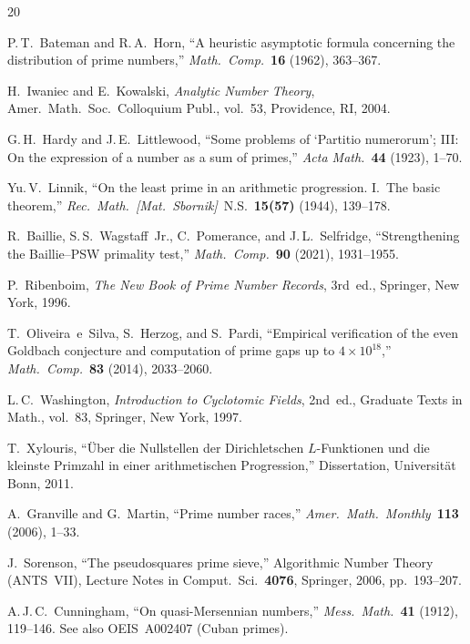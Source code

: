 \documentclass[11pt,a4paper]{article}
\begin{document}
\begin{thebibliography}{20}

P.\,T.~Bateman and R.\,A.~Horn,
``A heuristic asymptotic formula concerning the distribution of prime numbers,''
\textit{Math.\ Comp.}\ \textbf{16} (1962), 363--367.

H.~Iwaniec and E.~Kowalski,
\textit{Analytic Number Theory},
Amer.\ Math.\ Soc.\ Colloquium Publ., vol.~53, Providence, RI, 2004.

G.\,H.~Hardy and J.\,E.~Littlewood,
``Some problems of `Partitio numerorum'; III: On the expression of a number as a sum of primes,''
\textit{Acta Math.}\ \textbf{44} (1923), 1--70.

Yu.\,V.~Linnik,
``On the least prime in an arithmetic progression. I.\ The basic theorem,''
\textit{Rec.\ Math.\ [Mat.\ Sbornik]}\ N.S.\ \textbf{15(57)} (1944), 139--178.

R.~Baillie, S.\,S.~Wagstaff~Jr., C.~Pomerance, and J.\,L.~Selfridge,
``Strengthening the Baillie--PSW primality test,''
\textit{Math.\ Comp.}\ \textbf{90} (2021), 1931--1955.

P.~Ribenboim,
\textit{The New Book of Prime Number Records},
3rd~ed., Springer, New York, 1996.

T.~Oliveira~e~Silva, S.~Herzog, and S.~Pardi,
``Empirical verification of the even Goldbach conjecture and computation of prime gaps up to $4\times 10^{18}$,''
\textit{Math.\ Comp.}\ \textbf{83} (2014), 2033--2060.

L.\,C.~Washington,
\textit{Introduction to Cyclotomic Fields},
2nd~ed., Graduate Texts in Math., vol.~83, Springer, New York, 1997.

T.~Xylouris,
``\"Uber die Nullstellen der Dirichletschen $L$-Funktionen und die kleinste Primzahl in einer arithmetischen Progression,''
Dissertation, Universit\"at Bonn, 2011.

A.~Granville and G.~Martin,
``Prime number races,''
\textit{Amer.\ Math.\ Monthly}\ \textbf{113} (2006), 1--33.

J.~Sorenson,
``The pseudosquares prime sieve,''
Algorithmic Number Theory (ANTS~VII),
Lecture Notes in Comput.\ Sci.\ \textbf{4076}, Springer, 2006, pp.~193--207.

A.\,J.\,C.~Cunningham,
``On quasi-Mersennian numbers,''
\textit{Mess.\ Math.}\ \textbf{41} (1912), 119--146.
See also OEIS~A002407 (Cuban primes).


\end{thebibliography}
\end{document}
